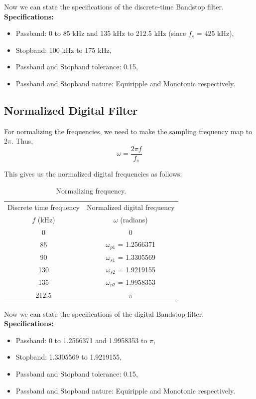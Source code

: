\documentclass[12pt]{article}
\begin{document}
Now we can state the specifications of the discrete-time Bandstop filter.
\newpage
\hline
\vspace{10pt}
\textbf{Specifications:}
\begin{itemize}
    \item Passband: 0 to 85 kHz and 135 kHz to 212.5 kHz (since $f_s$ = 425 kHz),
    \item Stopband: 100 kHz to 175 kHz,
    \item Passband and Stopband tolerance: 0.15,
    \item Passband and Stopband nature: Equiripple and Monotonic respectively.
\end{itemize}
\hline

\subsection{Normalized Digital Filter}
For normalizing the frequencies, we need to make the sampling frequency map to $2\pi$. Thus,
\[\omega = \frac{2\pi f}{f_s}\]

This gives us the normalized digital frequencies as follows:
\begin{table}[h]
    \centering
    \begin{tabular}{|c|c|}\hline
         Discrete time frequency&Normalized digital frequency\\
         $f$ (kHz)&$\omega$ (radians)\\\hline
         0&0\\\hline
         85&$\omega_{p1}$ = 1.2566371\\\hline
         90&$\omega_{s1}$ = 1.3305569\\\hline
         130&$\omega_{s2}$ = 1.9219155\\\hline
         135&$\omega_{p2}$ = 1.9958353\\\hline
         212.5&$\pi$\\\hline
    \end{tabular}
    \caption{Normalizing frequency.}
    \label{tab:1}
\end{table}

Now we can state the specifications of the digital Bandstop filter.
\newline
\hline
\vspace{10pt}
\textbf{Specifications:}
\begin{itemize}
    \item Passband: 0 to 1.2566371 and 1.9958353 to  $\pi$,
    \item Stopband: 1.3305569 to 1.9219155,
    \item Passband and Stopband tolerance: 0.15,
    \item Passband and Stopband nature: Equiripple and Monotonic respectively.
\end{itemize}
\hline
\end{document}
